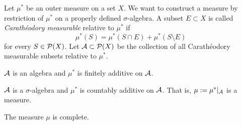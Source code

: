 \documentclass{../../large}
\begin{document}
\begin{prb}
Let $\mu^*$ be an outer measure on a set $X$.
We want to construct a measure by restriction of $\mu^*$ on a properly defined $\sigma$-algebra.
A subset $E\subset X$ is called \emph{Carath\'eodory measurable} relative to $\mu^*$ if
\[\mu^*(S)=\mu^*(S\cap E)+\mu^*(S\setminus E)\]
for every $S\in\mathcal{P}(X)$.
Let $\mathcal{A}\subset\mathcal{P}(X)$ be the collection of all Carath\'eodory measurable subsets relative to $\mu^*$.
\begin{parts}
\item $\mathcal{A}$ is an algebra and $\mu^*$ is finitely additive on $\mathcal{A}$.
\item $\mathcal{A}$ is a $\sigma$-algebra and $\mu^*$ is countably additive on $\mathcal{A}$. That is, $\mu:=\mu^*|_{\mathcal{A}}$ is a measure.
\item The measure $\mu$ is complete.
\end{parts}
\end{prb}
\begin{pf}
\end{pf}
\end{document}
